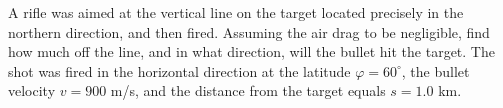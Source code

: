 \item A rifle was aimed at the vertical line on the target located precisely in the northern direction, and then fired. Assuming the air drag to be negligible, find how much off the line, and in what direction, will the bullet hit the target. The shot was fired in the horizontal direction at the latitude $\varphi = 60^\circ$, the bullet velocity $v = 900$ m/s, and the distance from the target equals $s = 1.0$ km.